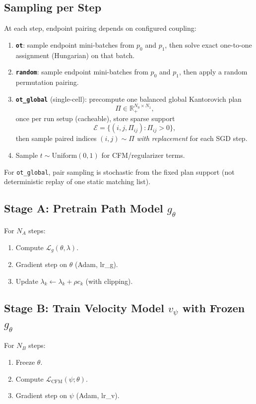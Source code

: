 \documentclass[11pt]{article}
\begin{document}
\subsection*{Sampling per Step}
At each step, endpoint pairing depends on configured coupling:
\begin{enumerate}
    \item \textbf{\texttt{ot}}: sample endpoint mini-batches from $p_0$ and $p_1$, then solve exact one-to-one assignment (Hungarian) on that batch.
    \item \textbf{\texttt{random}}: sample endpoint mini-batches from $p_0$ and $p_1$, then apply a random permutation pairing.
    \item \textbf{\texttt{ot\_global}} (single-cell): precompute one balanced global Kantorovich plan
    \[
    \Pi \in \mathbb{R}_{+}^{N_0\times N_1},
    \]
    once per run setup (cacheable), store sparse support
    \[
    \mathcal{E}=\{(i,j,\Pi_{ij}):\Pi_{ij}>0\},
    \]
    then sample paired indices $(i,j)\sim \Pi$ \emph{with replacement} for each SGD step.
    \item Sample $t \sim \mathrm{Uniform}(0,1)$ for CFM/regularizer terms.
\end{enumerate}
For \texttt{ot\_global}, pair sampling is stochastic from the fixed plan support (not deterministic replay of one static matching list).

\subsection*{Stage A: Pretrain Path Model $g_\theta$}
For $N_A$ steps:
\begin{enumerate}
    \item Compute $\mathcal{L}_g(\theta,\lambda)$.
    \item Gradient step on $\theta$ (Adam, lr\_g).
    \item Update $\lambda_k \leftarrow \lambda_k + \rho c_k$ (with clipping).
\end{enumerate}

\subsection*{Stage B: Train Velocity Model $v_\psi$ with Frozen $g_\theta$}
For $N_B$ steps:
\begin{enumerate}
    \item Freeze $\theta$.
    \item Compute $\mathcal{L}_{\mathrm{CFM}}(\psi;\theta)$.
    \item Gradient step on $\psi$ (Adam, lr\_v).
\end{enumerate}
\end{document}
